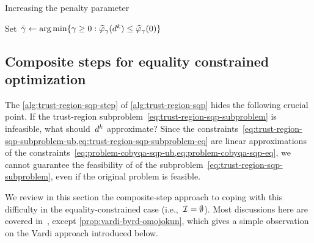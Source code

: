 \begin{algorithm}
    \caption{Increasing the penalty parameter}
    \label{alg:increase-penalty}
    \DontPrintSemicolon
    Set~$\bar{\gamma} \gets \argmin \set{\gamma \ge 0 : \meritm_{\gamma}(\step[k]) \le \meritm_{\gamma}(0)}$\;
\end{algorithm}

\subsection{Composite steps for equality constrained optimization}
\label{subsec:composite-step-equality}

The \cref{alg:trust-region-sqp-step} of \cref{alg:trust-region-sqp} hides the following crucial point.
If the trust-region subproblem~\cref{eq:trust-region-sqp-subproblem} is infeasible, what should~$\step[k]$ approximate?
Since the constraints~\cref{eq:trust-region-sqp-subproblem-ub,eq:trust-region-sqp-subproblem-eq} are linear approximations of the constraints~\cref{eq:problem-cobyqa-sqp-ub,eq:problem-cobyqa-sqp-eq}, we cannot guarantee the feasibility of of the subproblem~\cref{eq:trust-region-sqp-subproblem}, even if the original problem is feasible.

We review in this section the composite-step approach to coping with this difficulty in the equality-constrained case (i.e.,~$\mathcal{I} = \emptyset$).
Most discussions here are covered in~\cite[\S~15.4]{Conn_Gould_Toint_2000}, except \cref{prop:vardi-byrd-omojokun}, which gives a simple observation on the Vardi approach introduced below.

